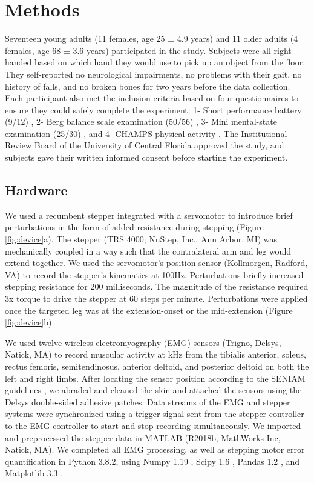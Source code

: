 \documentclass[../thesis_seyed.tex]{subfiles}
\begin{document}
\section{Methods}

Seventeen young adults (11 females, age 25 ± 4.9 years) and 11 older adults (4 females, age 68 ± 3.6 years) participated in the study. Subjects were all right-handed based on which hand they would use to pick up an object from the floor. They self-reported no neurological impairments, no problems with their gait, no history of falls, and no broken bones for two years before the data collection. Each participant also met the inclusion criteria based on four questionnaires to ensure they could safely complete the experiment: 1- Short performance battery (9/12) \cite{Guralnik1994-vy}, 2- Berg balance scale examination (50/56) \cite{Muir2008-yk}, 3- Mini mental-state examination (25/30) \cite{Tombaugh1992-rj}, and 4- CHAMPS physical activity \cite{Stewart2001-nx}. The Institutional Review Board of the University of Central Florida approved the study, and subjects gave their written informed consent before starting the experiment. 

\subsection{Hardware}
We used a recumbent stepper integrated with a servomotor \cite{Huang2009-of} to introduce brief perturbations in the form of added resistance during stepping (Figure \ref{fig:device}a). The stepper (TRS 4000; NuStep, Inc., Ann Arbor, MI) was mechanically coupled in a way such that the contralateral arm and leg would extend together. We used the servomotor's position sensor (Kollmorgen, Radford, VA) to record the stepper's kinematics at 100Hz. Perturbations briefly increased stepping resistance for 200 milliseconds. The magnitude of the resistance required 3x torque to drive the stepper at 60 steps per minute. Perturbations were applied once the targeted leg was at the extension-onset or the mid-extension (Figure \ref{fig:device}b).

We used twelve wireless electromyography (EMG) sensors (Trigno, Delsys, Natick, MA) to record muscular activity at  kHz from the tibialis anterior, soleus, rectus femoris, semitendinosus, anterior deltoid, and posterior deltoid on both the left and right limbs. After locating the sensor position according to the SENIAM guidelines \cite{Hermens1999-vg}, we abraded and cleaned the skin and attached the sensors using the Delsys double-sided adhesive patches. Data streams of the EMG and stepper systems were synchronized using a trigger signal sent from the stepper controller to the EMG controller to start and stop recording simultaneously. We imported and preprocessed the stepper data in MATLAB (R2018b, MathWorks Inc, Natick, MA). We completed all EMG processing, as well as stepping motor error quantification in Python 3.8.2, using Numpy 1.19 \cite{Harris2020-eg}, Scipy 1.6 \cite{Virtanen2020-do}, Pandas 1.2 \cite{McKinney2010-fq}, and Matplotlib 3.3 \cite{Hunter2007-ll}.
\end{document}

